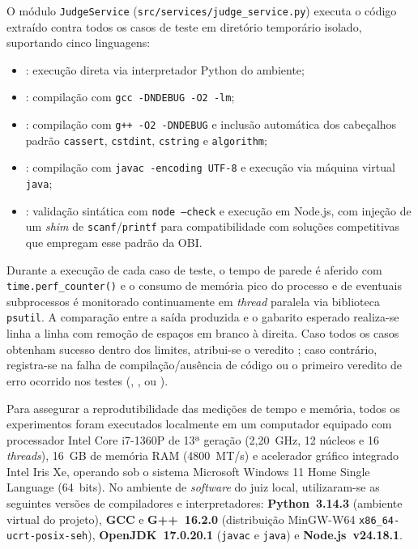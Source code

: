 O módulo \texttt{JudgeService} (\texttt{src/services/judge\_service.py}) executa o código extraído contra todos os casos de teste em diretório temporário isolado, suportando cinco linguagens:
\begin{itemize}
    \item {}: execução direta via interpretador Python do ambiente;
    \item {}: compilação com \texttt{gcc -DNDEBUG -O2 -lm};
    \item {}: compilação com \texttt{g++ -O2 -DNDEBUG} e inclusão automática dos cabeçalhos padrão \texttt{cassert}, \texttt{cstdint}, \texttt{cstring} e \texttt{algorithm};
    \item {}: compilação com \texttt{javac -encoding UTF-8} e execução via máquina virtual \texttt{java};
    \item {}: validação sintática com \texttt{node --check} e execução em Node.js, com injeção de um \textit{shim} de \texttt{scanf}/\texttt{printf} para compatibilidade com soluções competitivas que empregam esse padrão da OBI.
\end{itemize}

Durante a execução de cada caso de teste, o tempo de parede é aferido com \texttt{time.perf\_counter()} e o consumo de memória pico do processo e de eventuais subprocessos é monitorado continuamente em \textit{thread} paralela via biblioteca \texttt{psutil}. A comparação entre a saída produzida e o gabarito esperado realiza-se linha a linha com remoção de espaços em branco à direita. Caso todos os casos obtenham sucesso dentro dos limites, atribui-se o veredito ; caso contrário, registra-se  na falha de compilação/ausência de código ou o primeiro veredito de erro ocorrido nos testes (, ,  ou ).

Para assegurar a reprodutibilidade das medições de tempo e memória, todos os experimentos foram executados localmente em um computador equipado com processador Intel Core i7-1360P de 13ª geração (2,20~GHz, 12 núcleos e 16 \textit{threads}), 16~GB de memória RAM (4800~MT/s) e acelerador gráfico integrado Intel Iris Xe, operando sob o sistema Microsoft Windows 11 Home Single Language (64~bits). No ambiente de \textit{software} do juiz local, utilizaram-se as seguintes versões de compiladores e interpretadores: \textbf{Python~3.14.3} (ambiente virtual do projeto), \textbf{GCC} e \textbf{G++~16.2.0} (distribuição MinGW-W64 \texttt{x86\_64-ucrt-posix-seh}), \textbf{OpenJDK~17.0.20.1} (\texttt{javac} e \texttt{java}) e \textbf{Node.js~v24.18.1}.

